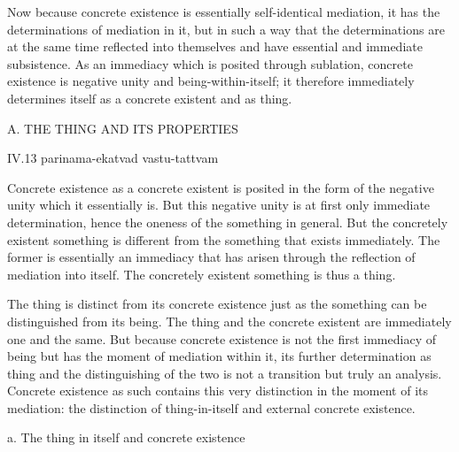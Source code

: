 Now because concrete existence is
essentially self-identical mediation,
it has the determinations of mediation in it,
but in such a way that the determinations are
at the same time reflected into themselves
and have essential and immediate subsistence.
As an immediacy which is posited through sublation,
concrete existence is negative unity and being-within-itself;
it therefore immediately determines itself
as a concrete existent and as thing.

A. THE THING AND ITS PROPERTIES

IV.13
parinama-ekatvad vastu-tattvam

Concrete existence as a concrete existent is posited in
the form of the negative unity which it essentially is.
But this negative unity is at first only immediate determination,
hence the oneness of the something in general.
But the concretely existent something is different
from the something that exists immediately.
The former is essentially an immediacy that has arisen
through the reflection of mediation into itself.
The concretely existent something is thus a thing.

The thing is distinct from its concrete existence
just as the something can be distinguished from its being.
The thing and the concrete existent
are immediately one and the same.
But because concrete existence is not
the first immediacy of being
but has the moment of mediation within it,
its further determination as thing
and the distinguishing of the two is
not a transition but truly an analysis.
Concrete existence as such contains
this very distinction in the moment of its mediation:
the distinction of thing-in-itself and external concrete existence.

a. The thing in itself and concrete existence

